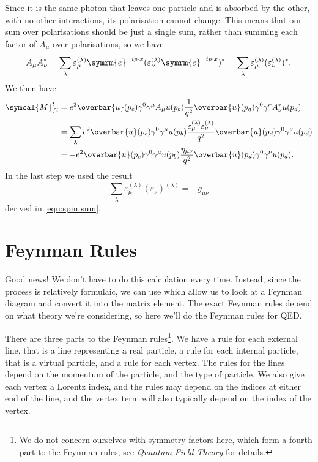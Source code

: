 \documentclass[fleqn]{NotesClass}
\newcommand{\course}[1]{\textit{#1}}
\newcommand{\e}{\symrm{e}}
\newcommand{\amplitude}{\symcal{M}}
\newcommand{\diracadjoint}[1]{\overbar{#1}}
\newcommand{\minkowskiMetric}{\eta}
\begin{document}
    Since it is the same photon that leaves one particle and is absorbed by the other, with no other interactions, its polarisation cannot change.
    This means that our sum over polarisations should be just a single sum, rather than summing each factor of \(A_\mu\) over polarisations, so we have
    \begin{equation}
        A_\mu A_\nu^* = \sum_{\lambda} \varepsilon_\mu^{(\lambda)}\e^{-ip\cdot x}(\varepsilon_\nu^{(\lambda)} \e^{-ip\cdot x})^* = \sum_{\lambda} \varepsilon_\mu^{(\lambda)} (\varepsilon_\nu^{(\lambda)})^*.
    \end{equation}
    We then have
    \begin{align}
        \amplitude_{fi}^t &= e^2 \diracadjoint{u}(p_c) \gamma^0\gamma^\mu A_\mu u(p_b) \frac{1}{q^2} \diracadjoint{u}(p_d) \gamma^0\gamma^\nu A_\nu^* u(p_d)\\
        &= \sum_\lambda e^2 \diracadjoint{u}(p_c) \gamma^0 \gamma^\mu u(p_b) \frac{\varepsilon_\mu^{(\lambda)} \varepsilon_\nu^{(\lambda)}}{q^2} \diracadjoint{u}(p_d) \gamma^0\gamma^\nu u(p_d)\\
        &= -e^2 \diracadjoint{u}(p_c) \gamma^0 \gamma^\mu u(p_b) \frac{\minkowskiMetric_{\mu\nu}}{q^2} \diracadjoint{u}(p_d) \gamma^0\gamma^\nu u(p_d).\label{eqn:electron tau scattering amplitude}
    \end{align}
    In the last step we used the result
    \begin{equation}
        \sum_\lambda \varepsilon_\mu^{(\lambda)}(\varepsilon_\nu)^{(\lambda)} = -g_{\mu\nu}
    \end{equation}
    derived in \cref{eqn:spin sum}.
    
    \section{Feynman Rules}
    Good news!
    We don't have to do this calculation every time.
    Instead, since the process is relatively formulaic, we can use  which allow us to look at a Feynman diagram and convert it into the matrix element.
    The exact Feynman rules depend on what theory we're considering, so here we'll do the Feynman rules for QED.
    
    There are three parts to the Feynman rules\footnote{We do not concern ourselves with symmetry factors here, which form a fourth part to the Feynman rules, see \course{Quantum Field Theory} for details.}.
    We have a rule for each external line, that is a line representing a real particle, a rule for each internal particle, that is a virtual particle, and a rule for each vertex.
    The rules for the lines depend on the momentum of the particle, and the type of particle.
    We also give each vertex a Lorentz index, and the rules may depend on the indices at either end of the line, and the vertex term will also typically depend on the index of the vertex.
    
\end{document}
